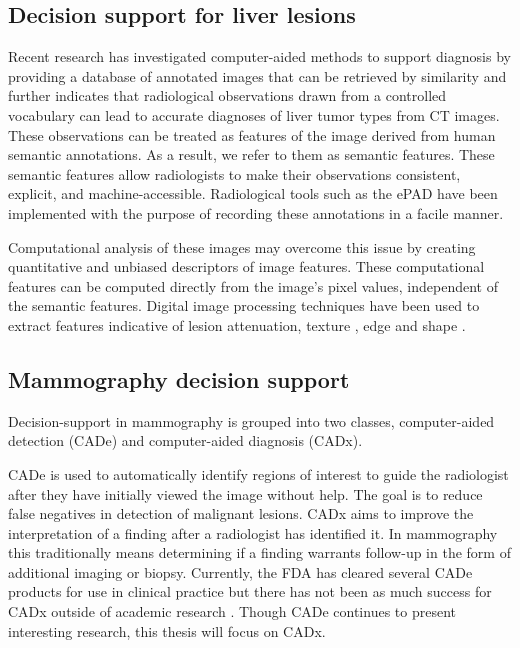 \subsection{Decision support for liver lesions}
Recent research has investigated computer-aided methods to support diagnosis by providing a database of annotated images that can be retrieved by similarity\cite{Napel:2010es} and further indicates that radiological observations drawn from a controlled vocabulary can lead to accurate diagnoses of liver tumor types from CT images\cite{Korenblum:2011gx}. These observations can be treated as features of the image derived from human semantic annotations. As a result, we refer to them as semantic features. These semantic features allow radiologists to make their observations consistent, explicit, and machine-accessible. Radiological tools such as the ePAD \cite{Rubin:2008uz} have been implemented with the purpose of recording these annotations in a facile manner.

Computational analysis of these images may overcome this issue by creating quantitative and unbiased descriptors of image features. These computational features can be computed directly from the image's pixel values, independent of the semantic features. Digital image processing techniques have been used to extract features indicative of lesion attenuation, texture \cite{Strela:2002vq,Zhao:2005wb}, edge and shape \cite{Hong:2006ti,Manay:2006un,MRangayyan:2005td,Xu:2012bh}.


\subsection{Mammography decision support}
Decision-support in mammography is grouped into two classes, computer-aided detection (CADe) and computer-aided diagnosis (CADx). 

CADe is used to automatically identify regions of interest to guide the radiologist after they have initially viewed the image without help. The goal is to reduce false negatives in detection of malignant lesions. CADx aims to improve the interpretation of a finding after a radiologist has identified it. In mammography this traditionally means determining if a finding warrants follow-up in the form of additional imaging or biopsy. Currently, the FDA has cleared several CADe products for use in clinical practice but there has not been as much success for CADx outside of academic research \cite{Castellino:2005ke, Oliver:2010fm, Fujita:2008it}. Though CADe continues to present interesting research, this thesis will focus on CADx.

